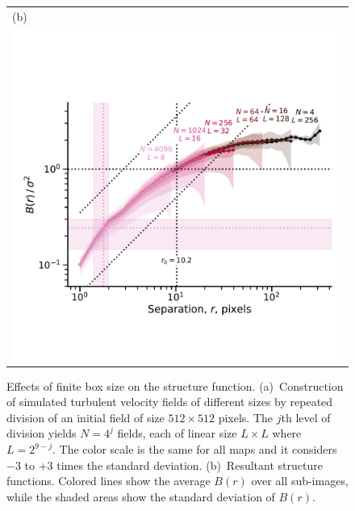 \documentclass[fleqn,usenatbib, useAMS, a4paper]{mnras}
\begin{document}
\begin{figure}
\begin{tabular}{@{} l @{}}
    (b)\\ \includegraphics[width=\linewidth]{Figures/fake-3d-finite-box-strucfunc-ems-fluct_sigE_1}
  \end{tabular}
  \caption{Effects of finite box size on the structure function.
    (a)~Construction of simulated turbulent velocity fields of different sizes
    by repeated division of an initial field of size \(512 \times 512\) pixels.
    The \(j\)th level of division yields \(N = 4^j\) fields,
    each of linear size \(L \times L\) where \(L = 2^{9 - j}\).
    The color scale is the same for all maps and it considers \(- 3\) to \(+ 3\) times the standard deviation.
    (b)~Resultant structure functions.
    Colored lines show the average \(B(r)\) over all sub-images,
    while the shaded areas show the standard deviation of \(B(r)\).
  }
  \label{fig:finite-box}
\end{figure}
\end{document}
